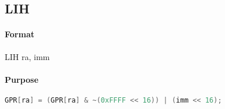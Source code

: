 \subsection{LIH}


\paragraph{Format} LIH ra, imm

\paragraph{Purpose}

\begin{lstlisting}[language=C]
    GPR[ra] = (GPR[ra] & ~(0xFFFF << 16)) | (imm << 16);
\end{lstlisting}